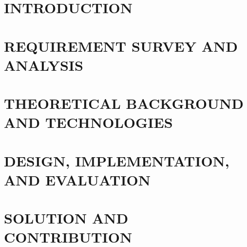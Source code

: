 \documentclass[a4paper,13pt,3p,twoside]{report}
\theoremstyle{definition}
\begin{document}
\renewcommand{\listtablename}{LIST OF TABLES}
{\let\oldnumberline\numberline
\renewcommand{\numberline}{Bảng~\oldnumberline}
\listoftables}

\glsaddall 
\renewcommand*{\acronymname}{LIST OF ABBREVIATIONS}
\renewcommand*{\entryname}{Abriviation}
\renewcommand*{\descriptionname}{Full Expression}
\printnoidxglossaries

% 

% 


\newpage
{}

\pagestyle{fancy}
\fancyhf{}
\fancyhead[RE, LO]{\leftmark}
\fancyfoot[RE, LO]{\thepage}

\chapter{INTRODUCTION}
\label{chapter:Introduction}

\newpage
\chapter{REQUIREMENT SURVEY AND ANALYSIS}
\label{chapter:Related_works}



\newpage
\chapter{THEORETICAL BACKGROUND AND TECHNOLOGIES}
\label{chapter:Methodology}


\newpage
\chapter{DESIGN, IMPLEMENTATION, AND EVALUATION}
\label{chapter:Experiment}


\newpage
\chapter{SOLUTION AND CONTRIBUTION}
\label{chapter:SolutionAndContribution}

\newpage
\end{document}
